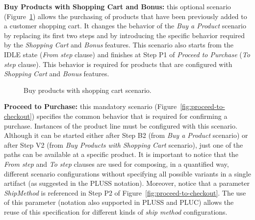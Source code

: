 \documentclass{report}
\begin{document}
\begin{frontmatter}
{\bf Buy Products with Shopping Cart and Bonus:} this optional scenario
(Figure~\ref{fig:buy-product-changing-flow}) allows the purchasing of products
that have been previously added to a customer shopping cart. It changes the
behavior of the \emph{Buy a Product} scenario by replacing its first two steps
and by introducing the specific behavior required by the \emph{Shopping Cart} and
\emph{Bonus} features. This scenario also starts from the IDLE state (\emph{From
step} clause) and finishes at Step P1 of \emph{Proceed to Purchase} (\emph{To
step} clause). This behavior is required for products that are configured with
\emph{Shopping Cart} and \emph{Bonus} features.

\begin{figure}[h]
\nocaptionrule \caption{Buy products with shopping cart scenario.}
\label{fig:buy-product-changing-flow}
\end{figure}

{\bf Proceed to Purchase:} this mandatory scenario
(Figure~\ref{fig:proceed-to-checkout}) specifies the common behavior that is
required for confirming a purchase. Instances of the product line must be
configured with this scenario. Although it can be started  either after Step B2
(from \emph{Buy a Product} scenario) or after Step V2 (from \emph{Buy Products
with Shopping Cart} scenario), just one of the paths can be available at a
specific product. It is important to notice that the \emph{From step} and
\emph{To step} clauses are used for composing, in a quantified way, different
scenario configurations without specifying all possible variants in a single
artifact (as suggested in the PLUSS notation). Moreover, notice that a parameter
\emph{ShipMethod} is referenced in Step P2 of
Figure~\ref{fig:proceed-to-checkout}. The use of this parameter (notation also
supported in PLUSS and PLUC) allows the reuse of this specification for different
kinds of \emph{ship method} configurations.


\end{frontmatter}
\end{document}
